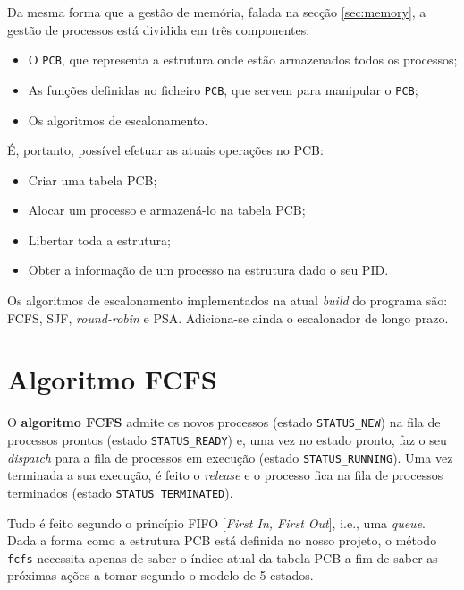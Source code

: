 \documentclass[10pt,oneside]{estiloUBI}
\begin{document}
	Da mesma forma que a gestão de memória, falada na secção \ref{sec:memory}, a gestão de processos está dividida em três componentes:
	
	\begin{itemize} %
	    \item O \texttt{\ac{PCB}}, que representa a estrutura onde estão armazenados todos os processos;
	    \item As funções definidas no ficheiro \texttt{\ac{PCB}}, que servem para manipular o \texttt{\ac{PCB}};
	    \item Os algoritmos de escalonamento.
	\end{itemize}  
	
	É, portanto, possível efetuar as atuais operações no \ac{PCB}:
	\begin{itemize}
	    \item Criar uma tabela \ac{PCB};
	    \item Alocar um processo e armazená-lo na tabela \ac{PCB};
	    \item Libertar toda a estrutura;
	    \item Obter a informação de um processo na estrutura dado o seu \ac{PID}.
	\end{itemize}
	
	Os algoritmos de escalonamento implementados na atual \textit{build} do programa são: \ac{FCFS}, \ac{SJF}, \textit{round-robin} e \ac{PSA}. Adiciona-se ainda o escalonador de longo prazo.
	
	
	\section{Algoritmo \ac{FCFS}}
	\label{ssec:process:fcfs}
	
	O \textbf{algoritmo \ac{FCFS}} admite os novos processos (estado \texttt{STATUS\_NEW}) na fila de processos prontos (estado \texttt{STATUS\_READY}) e, uma vez no estado pronto, faz o seu \textit{dispatch} para a fila de processos em execução (estado \texttt{STATUS\_RUNNING}). Uma vez terminada a sua execução, é feito o \textit{release} e o processo fica na fila de processos terminados (estado \texttt{STATUS\_TERMINATED}).
	
	Tudo é feito segundo o princípio FIFO [\textit{First In, First Out}], i.e., uma \textit{queue}. Dada a forma como a estrutura \ac{PCB} está definida no nosso projeto, o método \verb|fcfs| necessita apenas de saber o índice atual da tabela \ac{PCB} a fim de saber as próximas ações a tomar segundo o modelo de 5 estados.
	
\end{document}
